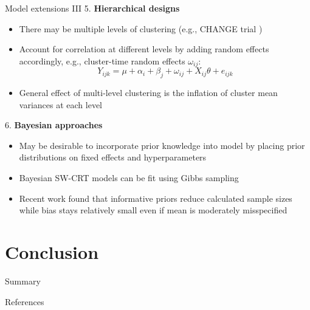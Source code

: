 \documentclass[9pt]{beamer}
\begin{document}
\begin{frame}{Model extensions III}
5. \textbf{Hierarchical designs}
\begin{itemize}

\item
There may be multiple levels of clustering (e.g., CHANGE trial \citep{Lescure:2021})

\item
Account for correlation at different levels by adding random effects accordingly, e.g., cluster-time random effects $\omega_{ij}$:
\[
Y_{ijk} = \mu + \alpha_i + \beta_j + \omega_{ij} + X_{ij}\theta + e_{ijk}
\]

\item
General effect of multi-level clustering is the inflation of cluster mean variances at each level \citep{Teerenstra:2019}

\end{itemize}
\vspace{2em}

6. \textbf{Bayesian approaches}
\begin{itemize}

\item
May be desirable to incorporate prior knowledge into model by placing prior distributions on fixed effects and hyperparameters

\item
Bayesian SW-CRT models can be fit using Gibbs sampling \citep{Cunanan:2016}

\item
Recent work found that informative priors reduce calculated sample sizes while bias stays relatively small even if mean is moderately misspecified \citep{Zhan:2021}

\end{itemize}
\end{frame}



\section{Conclusion}



\begin{frame}{Summary}
\end{frame}



\begin{frame}[allowframebreaks]{References}
\small


\end{frame}
\end{document}
